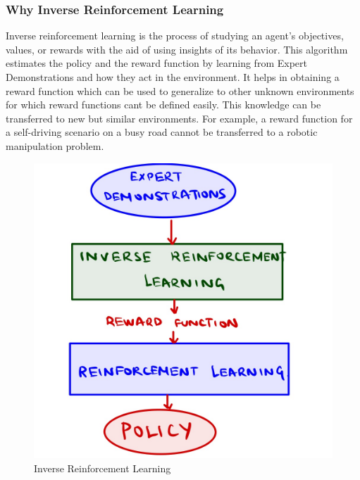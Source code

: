 \documentclass[11pt]{article}
\begin{document}
\subsubsection{Why Inverse Reinforcement Learning}
Inverse reinforcement learning is the process of studying an agent's objectives, values, or rewards with the aid of using insights of its behavior. This algorithm estimates the policy and the reward function by learning from Expert Demonstrations and how they act in the environment. It helps in obtaining a reward function which can be used to generalize to other unknown environments for which reward functions cant be defined easily. This knowledge can be transferred to new but similar environments. For example, a reward function for a self-driving scenario on a busy road cannot be transferred to a robotic manipulation problem.

\begin{figure}[H]
\centering
\includegraphics[width=0.8\linewidth]{figs/Image-1.jpg}
\caption{Inverse Reinforcement Learning}
\label{fig:nas}
\end{figure}
\end{document}
